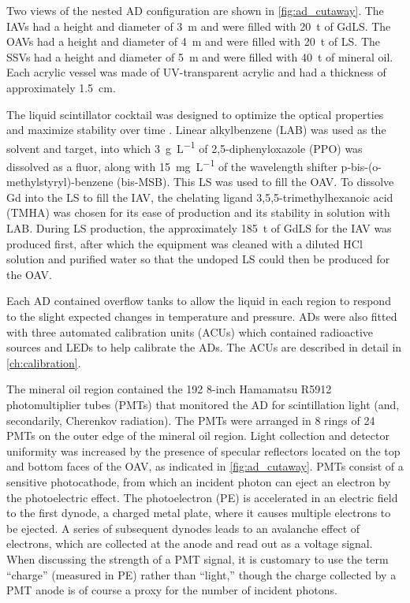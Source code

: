Two views of the nested AD configuration are shown in \cref{fig:ad_cutaway}.
The IAVs had a height and diameter of \SI{3}{\m} and were filled with \SI{20}{\tonne}
of GdLS.
The OAVs had a height and diameter of \SI{4}{\m} and were filled with \SI{20}{\tonne}
of LS.
The SSVs had a height and diameter of \SI{5}{\m} and were filled with \SI{40}{\tonne}
of mineral oil.
Each acrylic vessel was made of UV-transparent acrylic
and had a thickness of approximately \SI{1.5}{\cm}.

The liquid scintillator cocktail was designed to optimize the optical properties
and maximize stability over time \cite{gdls2014}.
Linear alkylbenzene (LAB) was used as the solvent and \nuebar{} target,
into which \SI{3}{\g\per\liter} of 2,5-diphenyloxazole (PPO)
was dissolved as a fluor,
along with \SI{15}{\mg\per\liter} of the wavelength shifter
p-bis-(o-methylstyryl)-benzene (bis-MSB).
This LS was used to fill the OAV.
To dissolve Gd into the LS to fill the IAV, the chelating ligand
3,5,5-trimethylhexanoic acid (TMHA) was chosen for its ease of production
and its stability in solution with LAB.
During LS production, the approximately \SI{185}{\tonne} of GdLS for the IAV
was produced first,
after which the equipment was cleaned with a diluted HCl solution and purified water
so that the undoped LS could then be produced for the OAV.

Each AD contained overflow tanks to allow the liquid in each region
to respond to the slight expected changes in temperature and pressure.
ADs were also fitted with three automated calibration units (ACUs)
which contained radioactive sources and LEDs to help calibrate the ADs.
The ACUs are described in detail in \cref{ch:calibration}.

The mineral oil region contained the 192 8-inch Hamamatsu R5912
photomultiplier tubes (PMTs) that monitored the AD for scintillation light
(and, secondarily, Cherenkov radiation).
The PMTs were arranged in 8 rings of 24 PMTs on the outer edge of the mineral oil region.
Light collection and detector uniformity was increased by the presence of
specular reflectors located on the top and bottom faces of the OAV,
as indicated in \cref{fig:ad_cutaway}.
PMTs consist of a sensitive photocathode, from which an incident photon
can eject an electron by the photoelectric effect.
The photoelectron (PE) is accelerated in an electric field to the first dynode,
a charged metal plate, where it causes multiple electrons to be ejected.
A series of subsequent dynodes leads to an avalanche effect of electrons,
which are collected at the anode and read out as a voltage signal.
When discussing the strength of a PMT signal,
it is customary to use the term ``charge'' (measured in PE)
rather than ``light,''
though the charge collected by a PMT anode
is of course a proxy for the number of incident photons.

